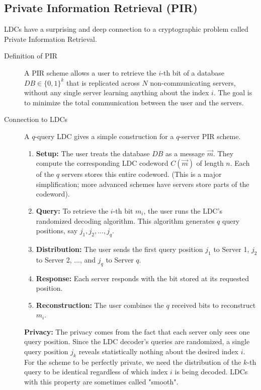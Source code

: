 \subsection{Private Information Retrieval (PIR)}

LDCs have a surprising and deep connection to a cryptographic problem called Private Information Retrieval.

\begin{description}
    \item[Definition of PIR] A PIR scheme allows a user to retrieve the $i$-th bit of a database $DB \in \{0,1\}^k$ that is replicated across $N$ non-communicating servers, without any single server learning anything about the index $i$. The goal is to minimize the total communication between the user and the servers.

    \item[Connection to LDCs] A $q$-query LDC gives a simple construction for a $q$-server PIR scheme.
    \begin{enumerate}
        \item \textbf{Setup:} The user treats the database $DB$ as a message $\vec{m}$. They compute the corresponding LDC codeword $C(\vec{m})$ of length $n$. Each of the $q$ servers stores this entire codeword. (This is a major simplification; more advanced schemes have servers store parts of the codeword).
        \item \textbf{Query:} To retrieve the $i$-th bit $m_i$, the user runs the LDC's randomized decoding algorithm. This algorithm generates $q$ query positions, say $j_1, j_2, \dots, j_q$.
        \item \textbf{Distribution:} The user sends the first query position $j_1$ to Server 1, $j_2$ to Server 2, ..., and $j_q$ to Server $q$.
        \item \textbf{Response:} Each server responds with the bit stored at its requested position.
        \item \textbf{Reconstruction:} The user combines the $q$ received bits to reconstruct $m_i$.
    \end{enumerate}
    \textbf{Privacy:} The privacy comes from the fact that each server only sees one query position. Since the LDC decoder's queries are randomized, a single query position $j_k$ reveals statistically nothing about the desired index $i$. For the scheme to be perfectly private, we need the distribution of the $k$-th query to be identical regardless of which index $i$ is being decoded. LDCs with this property are sometimes called "smooth".
\end{description}
